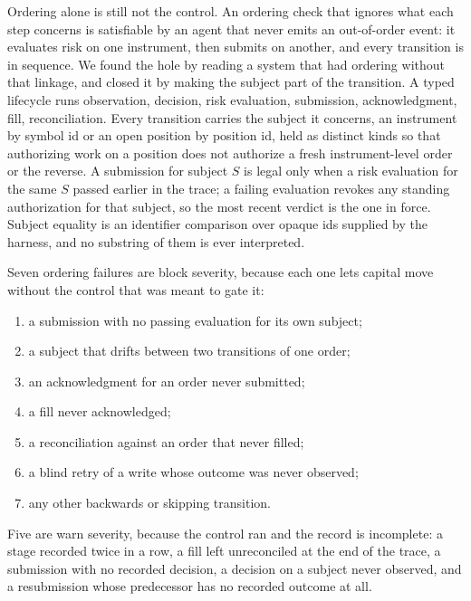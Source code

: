 Ordering alone is still not the control. An ordering check that ignores what each step concerns is satisfiable by an agent that never emits an out-of-order event: it evaluates risk on one instrument, then submits on another, and every transition is in sequence. We found the hole by reading a system that had ordering without that linkage, and closed it by making the subject part of the transition. A typed lifecycle runs observation, decision, risk evaluation, submission, acknowledgment, fill, reconciliation. Every transition carries the subject it concerns, an instrument by symbol id or an open position by position id, held as distinct kinds so that authorizing work on a position does not authorize a fresh instrument-level order or the reverse. A submission for subject $S$ is legal only when a risk evaluation for the same $S$ passed earlier in the trace; a failing evaluation revokes any standing authorization for that subject, so the most recent verdict is the one in force. Subject equality is an identifier comparison over opaque ids supplied by the harness, and no substring of them is ever interpreted.

Seven ordering failures are block severity, because each one lets capital move without the control that was meant to gate it:
\begin{enumerate}[leftmargin=*,itemsep=1pt]
\item a submission with no passing evaluation for its own subject;
\item a subject that drifts between two transitions of one order;
\item an acknowledgment for an order never submitted;
\item a fill never acknowledged;
\item a reconciliation against an order that never filled;
\item a blind retry of a write whose outcome was never observed;
\item any other backwards or skipping transition.
\end{enumerate}
Five are warn severity, because the control ran and the record is incomplete: a stage recorded twice in a row, a fill left unreconciled at the end of the trace, a submission with no recorded decision, a decision on a subject never observed, and a resubmission whose predecessor has no recorded outcome at all.

